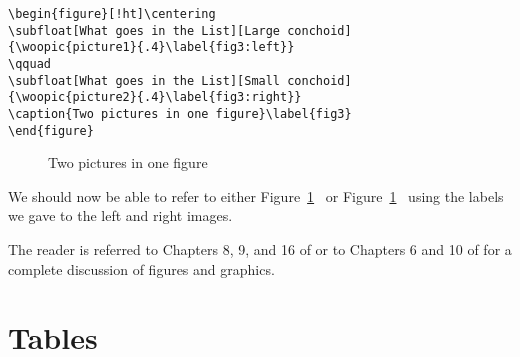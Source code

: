 \begin{singlespace}\small
\begin{verbatim}
\begin{figure}[!ht]\centering
\subfloat[What goes in the List][Large conchoid]
{\woopic{picture1}{.4}\label{fig3:left}}
\qquad
\subfloat[What goes in the List][Small conchoid]
{\woopic{picture2}{.4}\label{fig3:right}}
\caption{Two pictures in one figure}\label{fig3}
\end{figure}
\end{verbatim}
\end{singlespace}
\begin{figure}[!ht]\centering
{}
\qquad
{}
\caption{Two pictures in one figure}\label{fig3}
\end{figure}

We should now be able to refer to either Figure~\ref{fig3}~ or Figure~\ref{fig3}~ using the labels we gave to the left and right images.

The reader is referred to Chapters 8, 9, and 16 of \citet{kd03} or to Chapters 6 and 10 of \citet{mgbcr04} for a complete discussion of figures and graphics.

\section{Tables}

